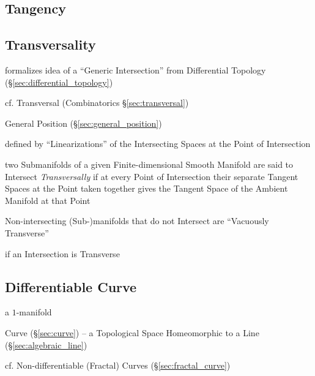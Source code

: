 \subsection{Tangency}\label{sec:tangency}

\subsection{Transversality}\label{sec:transversality}

formalizes idea of a ``Generic Intersection'' from Differential Topology
(\S\ref{sec:differential_topology})

cf. Transversal (Combinatorics \S\ref{sec:transversal})

General Position (\S\ref{sec:general_position})

defined by ``Linearizations'' of the Intersecting Spaces at the Point of
Intersection

two Submanifolds of a given Finite-dimensional Smooth Manifold are said to
Intersect \emph{Transversally} if at every Point of Intersection their separate
Tangent Spaces at the Point taken together gives the Tangent Space of the
Ambient Manifold at that Point

Non-intersecting (Sub-)manifolds that do not Intersect are ``Vacuously
Transverse''

if an Intersection is Transverse



\subsection{Differentiable Curve}\label{sec:differentiable_curve}

a $1$-manifold

\fist Curve (\S\ref{sec:curve}) -- a Topological Space Homeomorphic to a Line
(\S\ref{sec:algebraic_line})

cf. Non-differentiable (Fractal) Curves (\S\ref{sec:fractal_curve})



